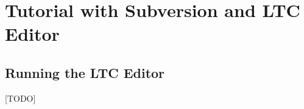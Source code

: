 \section{Tutorial with Subversion and LTC Editor} \label{sec:tutorial-svn}

\subsection{Running the LTC Editor}

[TODO]

